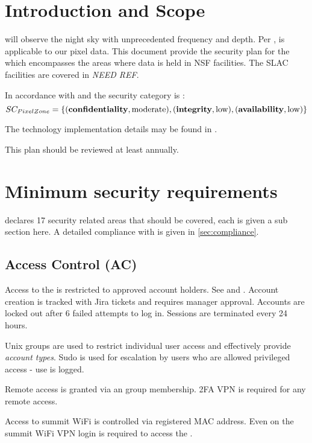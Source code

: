 
\section{Introduction and Scope}

\VRO will observe the night sky with unprecedented frequency and depth.
Per ,  is applicable to our pixel data.
This document provide the security plan for the \PZ which encompasses the areas where data is held in NSF facilities.
The SLAC facilities are covered in \emph{NEED REF}.

In accordance with  and  the  security category is :
\begin{equation} \label{eq:SC}
SC_{Pixel Zone} = \{({\bf confidentiality}, \text{moderate}), ({\bf integrity}, \text{low}), ({\bf availability}, \text{low})\}
\end{equation}

The technology implementation details may be found in .

This plan should be reviewed at least annually.


\section{Minimum security requirements} \label{sec:secreq}
 declares 17 security related areas that should be covered, each is given a sub section here.
A detailed compliance with  is given in \autoref{sec:compliance}.

\subsection{Access Control (AC)} \label{sec:AC}
Access to the \PZ is restricted to approved account holders. See  and .
Account creation is tracked with Jira tickets and requires manager approval.
Accounts are locked out after 6 failed attempts to log in.
Sessions are terminated every 24 hours.


Unix groups are used to restrict individual user access and effectively provide \emph{account types}.
Sudo is used for escalation by users who are allowed privileged access - use is logged.

Remote access is granted via an group membership. 2FA VPN is required for any remote access.

Access to summit WiFi is controlled via registered MAC address.
Even on the summit WiFi VPN login is required to access the \PZ.


